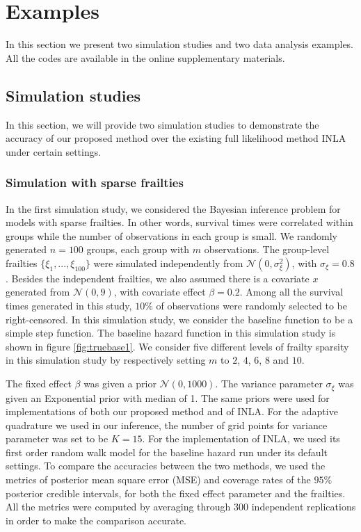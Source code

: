 \documentclass[ba]{imsart}
\begin{document}
\section{Examples}\label{sec:example}

In this section we present two simulation studies and two data analysis examples. All the codes are available in the online supplementary materials.

\subsection{Simulation studies}\label{subsec:sim}
In this section, we will provide two simulation studies to demonstrate the accuracy of our proposed method over the existing full likelihood method INLA under certain settings.

\subsubsection{Simulation with sparse frailties}\label{subsubsec:sim1}

In the first simulation study, we considered the Bayesian inference problem for models with sparse frailties. In other words, survival times were correlated within groups while the number of observations in each group is small. We randomly generated $n = 100$ groups, each group with $m$ observations. The group-level frailties $\{\xi_1,...,\xi_{100}\}$ were simulated independently from $\mathcal{N}(0,\sigma_\xi^{2})$, with $\sigma_{\xi} = 0.8$. Besides the independent frailties, we also assumed there is a covariate $x$ generated from $\mathcal{N}(0,9)$, with covariate effect $\beta = 0.2$. Among all the survival times generated in this study, $10\%$ of observations were randomly selected to be right-censored. In this simulation study, we consider the baseline function to be a simple step function. The baseline hazard function in this simulation study is shown in figure \ref{fig:truebase1}. We consider five different levels of frailty sparsity in this simulation study by respectively setting $m$ to $2$, $4$, $6$, $8$ and $10$.

The fixed effect $\beta$ was given a prior $\mathcal{N}(0,1000)$. The variance parameter $\sigma_\xi$ was given an Exponential prior with median of 1. The same priors were used for implementations of both our proposed method and of INLA. For the adaptive quadrature we used in our inference, the number of grid points for variance parameter was set to be $K = 15$. For the implementation of INLA, we used its first order random walk model for the baseline hazard run under its default settings. To compare the accuracies between the two methods, we used the metrics of posterior mean square error (MSE) and coverage rates of the $95\%$ posterior credible intervals, for both the fixed effect parameter and the frailties. All the metrics were computed by averaging through 300 independent replications in order to make the comparison accurate. 
\end{document}
